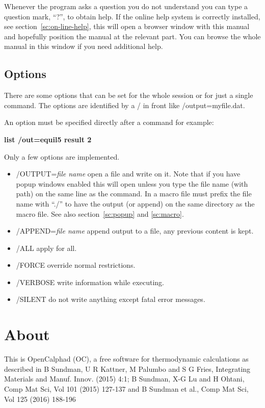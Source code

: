 \documentclass[11pt]{article}
\begin{document}
Whenever the program asks a question you do not understand you can
type a question mark, ``?'', to obtain help.  If the online help
system is correctly installed, see section~\ref{sc:on-line-help}, this
will open a browser window with this manual and hopefully position the
manual at the relevant part.  You can browse the whole manual in this
window if you need additional help.

\hypertarget{Command options}{}
\subsection{Options}\label{sc:options}

There are some options that can be set for the whole session or for just a
single command.  The options are identified by a / in front like
/output=myfile.dat.

An option must be specified directly after a command for example:

{\bf list /out=equil5 result 2}

Only a few options are implemented.

\begin{itemize}
\item /OUTPUT={\em file name} open a file and write on it.  Note that
  if you have popup windows enabled this will open unless you type the
  file name (with path) on the same line as the command.  In a macro
  file must prefix the file name with ``./'' to have the output (or
  append) on the same directory as the macro file.  See also
  section~\ref{sc:popup} and \ref{sc:macro}.
\item /APPEND={\em file name} append output to a file, any previous
  content is kept.
\item /ALL apply for all.
\item /FORCE override normal restrictions.
\item /VERBOSE write information while executing.
\item /SILENT do not write anything except fatal error messages.
\end{itemize}
\hypertarget{About}{}
\section{About}

This is OpenCalphad (OC), a free software for thermodynamic calculations as
described in B Sundman, U R Kattner, M Palumbo and S G Fries, Integrating
Materials and Manuf. Innov. (2015) 4:1; B Sundman, X-G Lu and H Ohtani,
Comp Mat Sci, Vol 101 (2015) 127-137 and B Sundman et al., Comp Mat Sci,
Vol 125 (2016) 188-196
\end{document}

